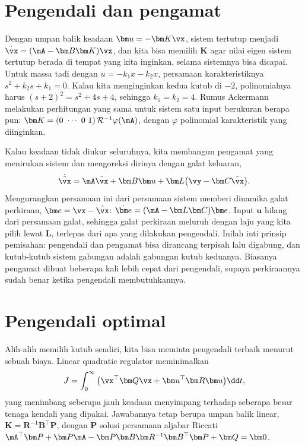 \section{Pengendali dan pengamat}

Dengan umpan balik keadaan $\bm u=-\bm K\vx$, sistem tertutup menjadi $\dot{\vx}=(\mA-\bm B\bm K)\vx$, dan kita bisa
memilih $\bm K$ agar nilai eigen sistem tertutup berada di tempat yang kita inginkan, selama sistemnya bisa
dicapai. Untuk massa tadi dengan $u=-k_1x-k_2\dot x$, persamaan karakteristiknya $s^2+k_2s+k_1=0$. Kalau kita
menginginkan kedua kutub di $-2$, polinomialnya harus $(s+2)^2=s^2+4s+4$, sehingga $k_1=k_2=4$. Rumus Ackermann
melakukan perhitungan yang sama untuk sistem satu input berukuran berapa pun:
$\bm K=(0\ \cdots\ 0\ 1)\,\mathcal R^{-1}\varphi(\mA)$, dengan $\varphi$ polinomial karakteristik yang diinginkan.

Kalau keadaan tidak diukur seluruhnya, kita membangun pengamat yang menirukan sistem dan mengoreksi dirinya
dengan galat keluaran,
\begin{equation}
\dot{\hat\vx}=\mA\hat\vx+\bm B\bm u+\bm L\big(\vy-\bm C\hat\vx\big).
\end{equation}
Mengurangkan persamaan ini dari persamaan sistem memberi dinamika galat perkiraan, $\bm e=\vx-\hat\vx$:
$\dot{\bm e}=(\mA-\bm L\bm C)\bm e$. Input $\bm u$ hilang dari persamaan galat, sehingga galat perkiraan meluruh
dengan laju yang kita pilih lewat $\bm L$, terlepas dari apa yang dilakukan pengendali. Inilah inti prinsip
pemisahan: pengendali dan pengamat bisa dirancang terpisah lalu digabung, dan kutub-kutub sistem gabungan adalah
gabungan kutub keduanya. Biasanya pengamat dibuat beberapa kali lebih cepat dari pengendali, supaya perkiraannya
sudah benar ketika pengendali membutuhkannya.

\section{Pengendali optimal}

Alih-alih memilih kutub sendiri, kita bisa meminta pengendali terbaik menurut sebuah biaya. Linear quadratic
regulator meminimalkan
\begin{equation}
J=\int_0^\infty\big(\vx^\top\bm Q\vx+\bm u^\top\bm R\bm u\big)\dd t,
\end{equation}
yang menimbang seberapa jauh keadaan menyimpang terhadap seberapa besar tenaga kendali yang dipakai.
Jawabannya tetap berupa umpan balik linear, $\bm K=\bm R^{-1}\bm B^\top\bm P$, dengan $\bm P$ solusi persamaan aljabar
Riccati $\mA^\top\bm P+\bm P\mA-\bm P\bm B\bm R^{-1}\bm B^\top\bm P+\bm Q=\bm0$.


